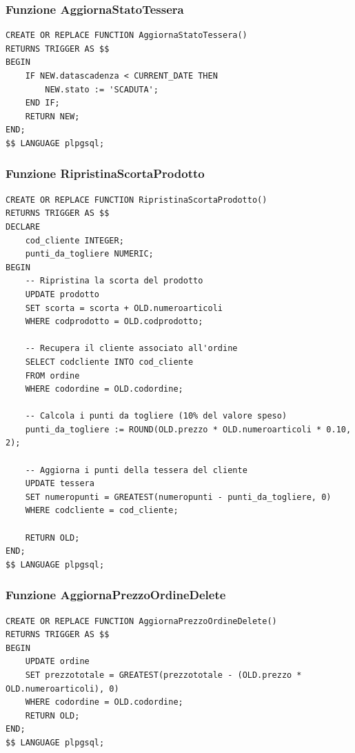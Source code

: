 \documentclass[a4paper,12pt]{article}
\begin{document}
\subsubsection*{Funzione AggiornaStatoTessera}
\vspace{1.5em}
\begin{lstlisting}[style=sqlstyle]
CREATE OR REPLACE FUNCTION AggiornaStatoTessera()
RETURNS TRIGGER AS $$
BEGIN
    IF NEW.datascadenza < CURRENT_DATE THEN
        NEW.stato := 'SCADUTA';
    END IF;
    RETURN NEW;
END;
$$ LANGUAGE plpgsql;
\end{lstlisting}
\vspace{1.5em}

\subsubsection*{Funzione RipristinaScortaProdotto}
\vspace{1.5em}
\begin{lstlisting}[style=sqlstyle]
CREATE OR REPLACE FUNCTION RipristinaScortaProdotto()
RETURNS TRIGGER AS $$
DECLARE
    cod_cliente INTEGER;
    punti_da_togliere NUMERIC;
BEGIN
    -- Ripristina la scorta del prodotto
    UPDATE prodotto
    SET scorta = scorta + OLD.numeroarticoli
    WHERE codprodotto = OLD.codprodotto;

    -- Recupera il cliente associato all'ordine
    SELECT codcliente INTO cod_cliente
    FROM ordine
    WHERE codordine = OLD.codordine;

    -- Calcola i punti da togliere (10% del valore speso)
    punti_da_togliere := ROUND(OLD.prezzo * OLD.numeroarticoli * 0.10, 2);

    -- Aggiorna i punti della tessera del cliente
    UPDATE tessera
    SET numeropunti = GREATEST(numeropunti - punti_da_togliere, 0)
    WHERE codcliente = cod_cliente;

    RETURN OLD;
END;
$$ LANGUAGE plpgsql;
\end{lstlisting}
\vspace{1.5em}

\subsubsection*{Funzione AggiornaPrezzoOrdineDelete}
\vspace{1.5em}
\begin{lstlisting}[style=sqlstyle]
CREATE OR REPLACE FUNCTION AggiornaPrezzoOrdineDelete()
RETURNS TRIGGER AS $$
BEGIN
    UPDATE ordine
    SET prezzototale = GREATEST(prezzototale - (OLD.prezzo * OLD.numeroarticoli), 0)
    WHERE codordine = OLD.codordine;
    RETURN OLD;
END;
$$ LANGUAGE plpgsql;
\end{lstlisting}
\vspace{1.5em}
\end{document}
